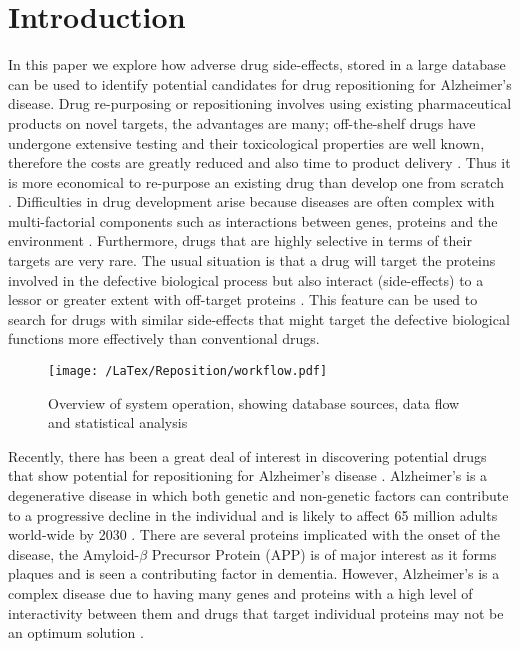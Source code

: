 \documentclass[preprint,11pt]{elsarticle}
\begin{document}
\section{Introduction}
In this paper we explore how adverse drug side-effects, stored in a large database can be used to identify potential candidates for drug repositioning for Alzheimer's disease. Drug re-purposing or repositioning involves using existing pharmaceutical products on novel targets, the advantages are many; off-the-shelf drugs have undergone extensive testing and their toxicological properties are well known, therefore the costs are greatly reduced and also time to product delivery \cite{Liu2014}. Thus it is more economical to re-purpose an existing drug than develop one from scratch \cite{Dudley2011}.  Difficulties in drug development arise because diseases are often complex with multi-factorial components such as interactions between genes, proteins and the environment \cite{Barrenas2009}. Furthermore, drugs that are highly selective in terms of their targets are very rare. The usual situation is that a drug will target the proteins involved in the defective biological process but also interact (side-effects) to a lessor or greater extent with off-target proteins \cite{Yang2014,Bisgin2012}. This feature can be used to search for  drugs with similar side-effects that might target the defective biological functions more effectively than conventional drugs.

\begin{figure*}[h]
  \begin{center}
	 \texttt{[image: /LaTex/Reposition/workflow.pdf]} %
  \end{center}
 \caption{Overview of system operation, showing database sources, data flow and statistical analysis}
\label{system}
\end{figure*}

Recently, there has been a great deal of interest in discovering potential drugs that show potential for repositioning for Alzheimer's disease \cite{Corbett2012}. Alzheimer's is a degenerative disease in which both genetic and non-genetic factors can contribute to a progressive decline in the individual and is likely to affect 65 million adults world-wide by 2030 \cite{Bandyopadhyay2014}.  There are several proteins implicated with the onset of the disease, the Amyloid-$\beta$ Precursor Protein (APP) is of major interest as it forms plaques and is seen a contributing factor in dementia. However, Alzheimer’s is a complex disease due to having many genes and proteins with a high level of interactivity between them and drugs that target individual proteins may not be an optimum solution \cite{Re2013,Oh2014}. 
 
\end{document}

